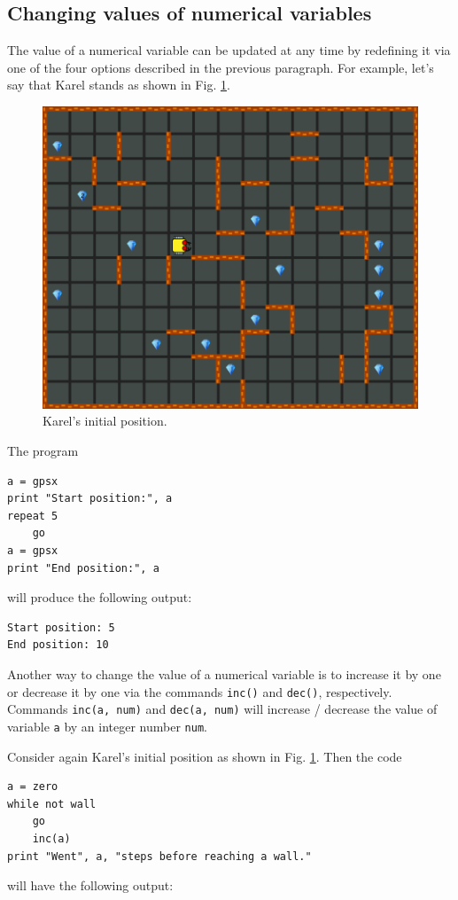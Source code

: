 \subsection{Changing values of numerical variables}

The value of a numerical variable can be updated at any time by redefining it via 
one of the four options described in the previous paragraph. For example, let's say that 
Karel stands as shown in Fig. \ref{fig:var1}.
\begin{figure}[!ht]
\begin{center}
\includegraphics[height=0.4\textwidth]{imgk/variables1.png}
\end{center}
\vspace{-4mm}
\caption{Karel's initial position.}
\label{fig:var1}
\end{figure}
\noindent
The program

\begin{verbatim}
a = gpsx
print "Start position:", a
repeat 5
    go
a = gpsx 
print "End position:", a
\end{verbatim}
will produce the following output:

\begin{verbatim}
Start position: 5
End position: 10
\end{verbatim}
Another way to change the value of a numerical variable is to increase it by one or 
decrease it by one via the commands {\tt inc()} and 
{\tt dec()}, respectively. Commands {\tt inc(a, num)} and 
{\tt dec(a, num)} will increase / decrease the value of variable {\tt a}
by an integer number {\tt num}.

Consider again Karel's initial position as shown 
in Fig. \ref{fig:var1}. Then the code

\begin{verbatim}
a = zero
while not wall
    go
    inc(a)
print "Went", a, "steps before reaching a wall."
\end{verbatim}
will have the following output:

